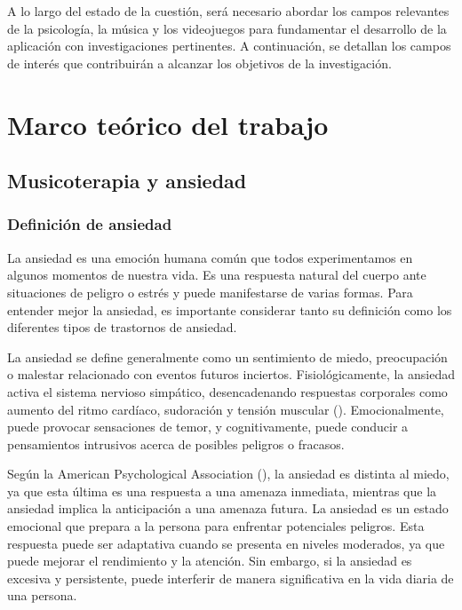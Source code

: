 A lo largo del estado de la cuestión, será necesario abordar los campos relevantes de la psicología, la música y los videojuegos para fundamentar el desarrollo de la aplicación con investigaciones pertinentes. A continuación, se detallan los campos de interés que contribuirán a alcanzar los objetivos de la investigación.

\section{Marco teórico del trabajo}

\subsection{Musicoterapia y ansiedad}

\subsubsection{Definición de ansiedad}

La ansiedad es una emoción humana común que todos experimentamos en algunos momentos de nuestra vida. Es una respuesta natural del cuerpo ante situaciones de peligro o estrés y puede manifestarse de varias formas. Para entender mejor la ansiedad, es importante considerar tanto su definición como los diferentes tipos de trastornos de ansiedad.

La ansiedad se define generalmente como un sentimiento de miedo, preocupación o malestar relacionado con eventos futuros inciertos. Fisiológicamente, la ansiedad activa el sistema nervioso simpático, desencadenando respuestas corporales como aumento del ritmo cardíaco, sudoración y tensión muscular (\cite{APA:2013}). Emocionalmente, puede provocar sensaciones de temor, y cognitivamente, puede conducir a pensamientos intrusivos acerca de posibles peligros o fracasos.

Según la American Psychological Association (\citeyear{APA:2020}), la ansiedad es distinta al miedo, ya que esta última es una respuesta a una amenaza inmediata, mientras que la ansiedad implica la anticipación a una amenaza futura. La ansiedad es un estado emocional que prepara a la persona para enfrentar potenciales peligros. Esta respuesta puede ser adaptativa cuando se presenta en niveles moderados, ya que puede mejorar el rendimiento y la atención. Sin embargo, si la ansiedad es excesiva y persistente, puede interferir de manera significativa en la vida diaria de una persona.

